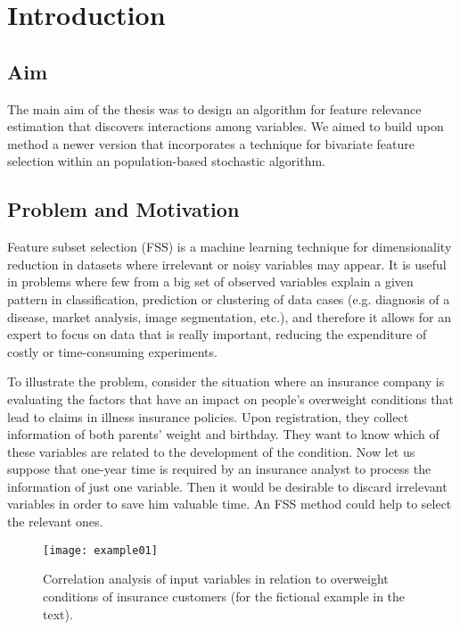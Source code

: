 \chapter{Introduction}
\label{ch:intro}

\section{Aim}

The main aim of the thesis was to design an algorithm for feature relevance estimation that discovers interactions among variables.  We aimed to build upon \WK~ method a newer version that incorporates a technique for bivariate feature selection within an population-based stochastic algorithm.  

\section{Problem and Motivation}
Feature subset selection (FSS) is a machine learning technique for dimensionality reduction in datasets where irrelevant or noisy variables may appear. It is useful in problems where few from a big set of observed variables explain a given pattern in classification, prediction or clustering of data cases (e.g. diagnosis of a disease, market analysis, image segmentation, etc.), and therefore it allows for an expert to focus on data that is really important, reducing the expenditure of costly or time-consuming experiments.  

To illustrate the problem, consider the situation where an insurance company is evaluating the factors that have an impact on people's overweight conditions that lead to claims in illness insurance policies. Upon registration, they collect information of both parents' weight and birthday. They want to know which of these variables are related to the development of the condition. Now let us suppose that one-year time is required by an insurance analyst to process the information of just one variable. Then it would be desirable to discard irrelevant variables in order to save him valuable time. An FSS method could help to select the relevant ones.

\begin{figure}[h]
	\centering
		\texttt{[image: example01]}
	\caption[Correlation analysis of input variables in relation to overweight conditions of insurance customers.]%
	{Correlation analysis of input variables in relation to overweight conditions of insurance customers (for the fictional example in the text).}
	\label{fig:im01}
\end{figure}


